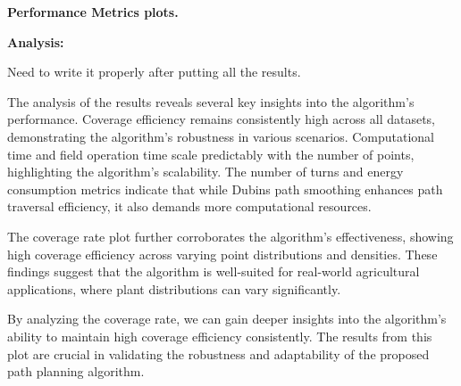 \textbf{Performance Metrics plots.}  



\textbf{Analysis: }

Need to write it properly after putting all the results.   

The analysis of the results reveals several key insights into the algorithm's performance. Coverage efficiency remains consistently high across all datasets, demonstrating the algorithm's robustness in various scenarios. Computational time and field operation time scale predictably with the number of points, highlighting the algorithm's scalability. The number of turns and energy consumption metrics indicate that while Dubins path smoothing enhances path traversal efficiency, it also demands more computational resources. 

\vspace*{6mm}

The coverage rate plot further corroborates the algorithm's effectiveness, showing high coverage efficiency across varying point distributions and densities. These findings suggest that the algorithm is well-suited for real-world agricultural applications, where plant distributions can vary significantly.

\vspace*{6mm}  


By analyzing the coverage rate, we can gain deeper insights into the algorithm's ability to maintain high coverage efficiency consistently. The results from this plot are crucial in validating the robustness and adaptability of the proposed path planning algorithm. 
